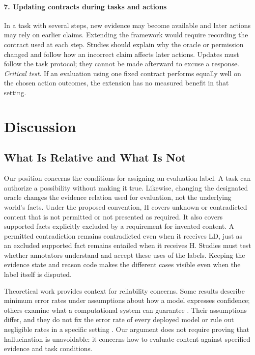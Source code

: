 \documentclass{clv2025}
\begin{document}
\paragraph{7. Updating contracts during tasks and actions}
In a task with several steps, new evidence may become available and later
actions may rely on earlier claims. Extending the framework would require
recording the contract used at each step. Studies should explain why the
oracle or permission changed and follow how an incorrect claim affects later
actions. Updates must follow the task protocol; they cannot be made afterward
to excuse a response.
\emph{Critical test.} If an evaluation using one fixed contract performs
equally well on the chosen action outcomes, the extension has no measured
benefit in that setting.

\section{Discussion}\label{sec:discussion}

\subsection{What Is Relative and What Is Not}\label{subsec:relative}

Our position concerns the conditions for assigning an evaluation label.
A task can authorize a possibility without making it true. Likewise,
changing the designated oracle changes the evidence relation used for
evaluation, not the underlying world's facts. Under the proposed convention,
H covers unknown or contradicted content that is not permitted or not presented
as required. It also covers supported facts explicitly excluded by a requirement
for invented content. A permitted contradiction remains contradicted even when
it receives LD, just as an excluded supported fact remains entailed when it
receives H. Studies must test whether annotators understand and accept these
uses of the labels. Keeping the evidence state and reason code makes the
different cases visible even when the label itself is disputed.

Theoretical work provides context for reliability concerns. Some results
describe minimum error rates under assumptions about how a model expresses
confidence; others examine what a computational system can guarantee
\citep{kalai_calibrated_2024,xu_hallucination_2024,banerjee_llms_2024}.
Their assumptions differ, and they do not fix the error rate of every
deployed model or rule out negligible rates in a specific setting
\citep{suzuki_negligible_2025}. Our argument does not require proving that
hallucination is unavoidable: it concerns how to evaluate content against
specified evidence and task conditions.
\end{document}
